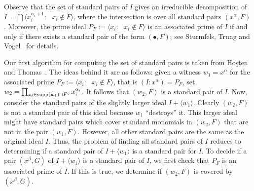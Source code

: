 Observe that the set of standard pairs of $I$ gives an irreducible
decomposition of $I = \bigcap \langle
x_{i}^{\alpha_{i}+1} : \text{ $x_{i} \notin F$} \rangle$, where the
intersection is over all standard pairs $(x^{\alpha}, F)$.  Moreover,
the prime ideal $P_F := \langle x_{i} : \text{ $x_{i} \notin F$}
\rangle$ is an associated prime of $I$ if and only if there exists a
standard pair of the form $(\bullet, F)$; see Sturmfels, Trung and
Vogel~\cite{MR96i:13029} for details.

Our first algorithm for computing the set of standard
pairs is taken from Ho\c{s}ten and
Thomas~\cite{MR2000f:13052}.  The ideas behind it are as follows:
given a witness $w_1 = x^{\alpha}$ for the associated prime $P_F :=
\langle x_{i} : \text{ $x_{i} \notin F$} \rangle$, that is $(I :
x^{\alpha}) = P_F$, set $w_2 = \prod_{x_i \in \operatorname{supp}(w_1) \cap F^c}
x_i^{\alpha_{i}}$.  It follows that $(w_2, F)$ is a standard pair of
$I$.  Now, consider the standard pairs of the slightly larger ideal $I
+ \langle w_1 \rangle$.  Clearly $(w_2, F)$ is not a standard pair of
this ideal because $w_1$ ``destroys'' it.  This larger ideal might
have standard pairs which cover standard monomials in $(w_2, F)$ that
are not in the pair $(w_1, F)$.  However, all other standard pairs are
the same as the original ideal $I$.  Thus, the problem of finding all
standard pairs of $I$ reduces to determining if a standard pair of $I
+ \langle w_1 \rangle$ is a standard pair for $I$.  To decide if a
pair $(x^{\beta}, G)$ of $I + \langle w_1 \rangle$ is a standard pair
of $I$, we first check that $P_{F}$ is an associated prime of $I$.  If
this is true, we determine if $(w_{2},F)$ is covered by
$(x^{\beta},G)$.

